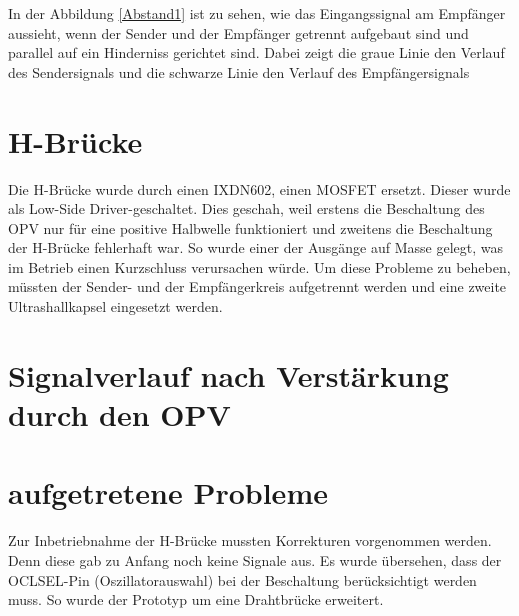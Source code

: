 In der Abbildung \ref{Abstand1} ist zu sehen, wie das Eingangssignal am Empfänger aussieht, wenn der Sender und der Empfänger getrennt aufgebaut sind und parallel auf ein Hinderniss gerichtet sind. Dabei zeigt die graue Linie den Verlauf des Sendersignals und die schwarze Linie den Verlauf des Empfängersignals
\section{H-Brücke}
Die H-Brücke wurde durch einen IXDN602, einen MOSFET ersetzt. Dieser wurde als Low-Side Driver-geschaltet. Dies geschah, weil erstens die Beschaltung des OPV nur für eine positive Halbwelle funktioniert und zweitens die Beschaltung der H-Brücke fehlerhaft war. So wurde einer der Ausgänge auf Masse gelegt, was im Betrieb einen Kurzschluss verursachen würde. Um diese Probleme zu beheben, müssten der Sender- und der Empfängerkreis aufgetrennt werden und eine zweite Ultrashallkapsel eingesetzt werden.

\section{Signalverlauf nach Verstärkung durch den OPV}

\section{aufgetretene Probleme}
Zur Inbetriebnahme der H-Brücke mussten Korrekturen vorgenommen werden. Denn diese gab zu Anfang noch keine Signale aus. Es wurde übersehen, dass der OCLSEL-Pin (Oszillatorauswahl) bei der Beschaltung berücksichtigt werden muss. So wurde der Prototyp um eine Drahtbrücke erweitert.

